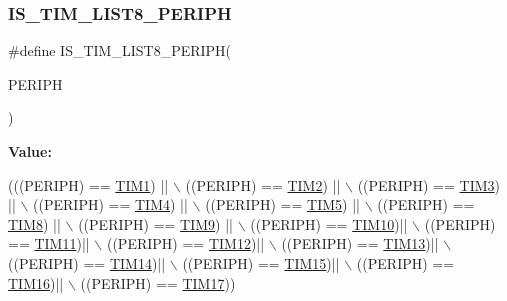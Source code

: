 \subsubsection{\texorpdfstring{I\+S\+\_\+\+T\+I\+M\+\_\+\+L\+I\+S\+T8\+\_\+\+P\+E\+R\+I\+PH}{IS\_TIM\_LIST8\_PERIPH}}
{\footnotesize\ttfamily \#define I\+S\+\_\+\+T\+I\+M\+\_\+\+L\+I\+S\+T8\+\_\+\+P\+E\+R\+I\+PH(\begin{DoxyParamCaption}\item[{}]{P\+E\+R\+I\+PH }\end{DoxyParamCaption})}

{\bfseries Value\+:}
\begin{DoxyCode}
(((PERIPH) == \hyperlink{group___peripheral__declaration_ga2e87451fea8dc9380056d3cfc5ed81fb}{TIM1}) || \(\backslash\)
                                      ((PERIPH) == \hyperlink{group___peripheral__declaration_ga3cfac9f2e43673f790f8668d48b4b92b}{TIM2}) || \(\backslash\)
                                      ((PERIPH) == \hyperlink{group___peripheral__declaration_ga61ee4c391385607d7af432b63905fcc9}{TIM3}) || \(\backslash\)
                                      ((PERIPH) == \hyperlink{group___peripheral__declaration_ga91a09bad8bdc7a1cb3d85cf49c94c8ec}{TIM4}) || \(\backslash\)
                                      ((PERIPH) == \hyperlink{group___peripheral__declaration_ga5125ff6a23a2ed66e2e19bd196128c14}{TIM5}) || \(\backslash\)
                                      ((PERIPH) == \hyperlink{group___peripheral__declaration_ga9a3660400b17735e91331f256095810e}{TIM8}) || \(\backslash\)
                                      ((PERIPH) == \hyperlink{group___peripheral__declaration_gaf52b4b4c36110a0addfa98059f54a50e}{TIM9}) || \(\backslash\)
                                      ((PERIPH) == \hyperlink{group___peripheral__declaration_ga46b2ad3f5f506f0f8df0d2ec3e767267}{TIM10})|| \(\backslash\)
                                      ((PERIPH) == \hyperlink{group___peripheral__declaration_gacfd11ef966c7165f57e2cebe0abc71ad}{TIM11})|| \(\backslash\)
                                      ((PERIPH) == \hyperlink{group___peripheral__declaration_ga2397f8a0f8e7aa10cf8e8c049e431e53}{TIM12})|| \(\backslash\)
                                      ((PERIPH) == \hyperlink{group___peripheral__declaration_ga5a959a833074d59bf6cc7fb437c65b18}{TIM13})|| \(\backslash\)
                                      ((PERIPH) == \hyperlink{group___peripheral__declaration_ga2dd30f46fad69dd73e1d8941a43daffe}{TIM14})|| \(\backslash\)
                                      ((PERIPH) == \hyperlink{group___peripheral__declaration_ga87e4b442041d1c03a6af113fbe04a182}{TIM15})|| \(\backslash\)
                                      ((PERIPH) == \hyperlink{group___peripheral__declaration_ga73ec606e7dacf17e18c661e8ff8c7c8d}{TIM16})|| \(\backslash\)
                                      ((PERIPH) == \hyperlink{group___peripheral__declaration_ga65aea6c8b36439e44ad6cde0e6891aab}{TIM17}))
\end{DoxyCode}


